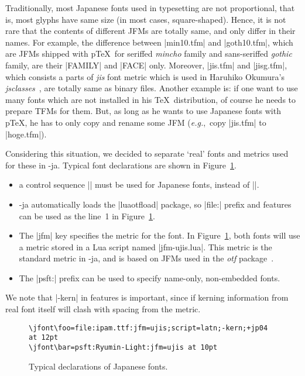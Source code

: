 \documentclass{ajt}
\begin{document}
Traditionally, most Japanese fonts used in typesetting are not proportional,
that is, most glyphs have same size (in most cases,
square-shaped). Hence, it is not rare that the contents of different
JFMs are totally same, and only differ in their names. For example, the
difference between |min10.tfm| and |goth10.tfm|, which are JFMs shipped
with p\TeX\ for seriffed \emph{mincho} family and sans-seriffed
\emph{gothic} family, are their |FAMILY| and |FACE| only. Moreover,
|jis.tfm| and |jisg.tfm|, which consists a parts of \emph{jis} font
metric which is used in Haruhiko Okumura's
\emph{jsclasses}~\cite{jsclasses}, are totally same as binary files.
Another example is: if one want to use many fonts which are not
installed in his \TeX\ distribution, of course he needs to prepare TFMs
for them. But, as long as he wants to use Japanese fonts with p\TeX, he
has to only copy and rename some JFM (\emph{e.g.},~copy |jis.tfm| to
|hoge.tfm|).

Considering this situation, we decided to separate `real' fonts and
metrics used for these in \LuaTeX-ja. Typical font declarations are shown in
Figure~\ref{fig-jfdef}.
\begin{itemize}
\item a control sequence |\jfont| must be used for Japanese fonts, instead of |\font|.
\item \LuaTeX-ja automatically loads the |luaotfload| package, so
      |file:| prefix and features can be used as the line~1 in
      Figure~\ref{fig-jfdef}.
\item The |jfm| key specifies the metric for the font. In
      Figure~\ref{fig-jfdef}, both fonts will use a metric stored in a
      Lua script named |jfm-ujis.lua|. This metric is the standard
      metric in \LuaTeX-ja, and is based on JFMs used in the \emph{otf}
      package~\cite{otf}.
\item The |psft:| prefix can be used to specify name-only, non-embedded
      fonts. 
\end{itemize}
We note that |-kern| in features is important, since if kerning
information from real font itself will clash with spacing from the
metric.

\begin{figure}
\begin{verbatim}
\jfont\foo=file:ipam.ttf:jfm=ujis;script=latn;-kern;+jp04 at 12pt
\jfont\bar=psft:Ryumin-Light:jfm=ujis at 10pt
\end{verbatim}
\caption{Typical declarations of Japanese fonts.}
\label{fig-jfdef}
\end{figure}
\end{document}
